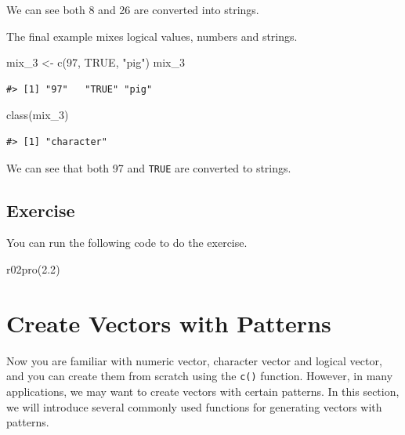 \documentclass[
]{book}
\newenvironment{Shaded}{\begin{snugshade}}{\end{snugshade}}
\newcommand{\ConstantTok}[1]{\textcolor[rgb]{0.00,0.00,0.00}{#1}}
\newcommand{\DecValTok}[1]{\textcolor[rgb]{0.00,0.00,0.81}{#1}}
\newcommand{\FloatTok}[1]{\textcolor[rgb]{0.00,0.00,0.81}{#1}}
\newcommand{\FunctionTok}[1]{\textcolor[rgb]{0.00,0.00,0.00}{#1}}
\newcommand{\NormalTok}[1]{#1}
\newcommand{\OtherTok}[1]{\textcolor[rgb]{0.56,0.35,0.01}{#1}}
\newcommand{\StringTok}[1]{\textcolor[rgb]{0.31,0.60,0.02}{#1}}
\begin{document}
We can see both 8 and 26 are converted into strings.

The final example mixes logical values, numbers and strings.

\begin{Shaded}
\begin{Highlighting}[]
\NormalTok{mix\_3 }\OtherTok{\textless{}{-}} \FunctionTok{c}\NormalTok{(}\DecValTok{97}\NormalTok{, }\ConstantTok{TRUE}\NormalTok{, }\StringTok{"pig"}\NormalTok{)}
\NormalTok{mix\_3}
\end{Highlighting}
\end{Shaded}

\begin{verbatim}
#> [1] "97"   "TRUE" "pig"
\end{verbatim}

\begin{Shaded}
\begin{Highlighting}[]
\FunctionTok{class}\NormalTok{(mix\_3)}
\end{Highlighting}
\end{Shaded}

\begin{verbatim}
#> [1] "character"
\end{verbatim}

We can see that both 97 and \texttt{TRUE} are converted to strings.

\hypertarget{exercise-2}{%
\subsection{Exercise}\label{exercise-2}}

You can run the following code to do the exercise.

\begin{Shaded}
\begin{Highlighting}[]
\FunctionTok{r02pro}\NormalTok{(}\FloatTok{2.2}\NormalTok{)}
\end{Highlighting}
\end{Shaded}

\hypertarget{vector-patterns}{%
\section{Create Vectors with Patterns}\label{vector-patterns}}

Now you are familiar with numeric vector, character vector and logical vector, and you can create them from scratch using the \texttt{c()} function. However, in many applications, we may want to create vectors with certain patterns. In this section, we will introduce several commonly used functions for generating vectors with patterns.
\end{document}
